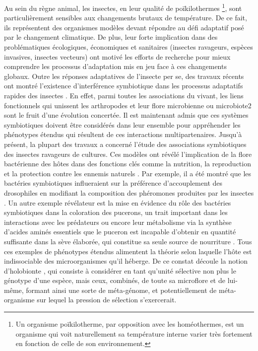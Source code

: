 Au sein du règne animal, les insectes, en leur qualité de poïkilothermes%
\footnote{Un organisme poïkilotherme, par opposition avec les homéothermes, est un organisme qui voit naturellement sa température interne varier très fortement en fonction de celle de son environnement.},
sont particulièrement sensibles aux changements brutaux de température.
De ce fait, ils représentent des organismes modèles devant répondre au défi adaptatif posé par le changement climatique.
De plus, leur forte implication dans des problématiques écologiques, économiques et sanitaires (insectes ravageurs, espèces invasives, insectes vecteurs) ont motivé les efforts de recherche pour mieux comprendre les processus d'adaptation mis en jeu face à ces changements globaux.
Outre les réponses adaptatives de l'insecte per se, des travaux récents ont montré l'existence d'interférence symbiotique dans les processus adaptatifs rapides des insectes \cite{feldhaar2011}.
En effet, parmi toutes les associations du vivant, les liens fonctionnels qui unissent les arthropodes et leur flore microbienne ou microbiote2 sont le fruit d'une évolution concertée.
Il est maintenant admis que ces systèmes symbiotiques doivent être considérés dans leur ensemble pour appréhender les phénotypes étendus qui résultent de ces interactions multipartenaires.
Jusqu'à présent, la plupart des travaux a concerné l'étude des  associations  symbiotiques  des  insectes  ravageurs  de  cultures.
Ces  modèles  ont  révélé  l'implication  de  la  flore  bactérienne  des  hôtes  dans  des  fonctions  clés  comme  la nutrition, la reproduction et la protection contre les ennemis naturels \cite{dillondillon}.
Par exemple, il a été montré que les bactéries symbiotiques influeraient sur la préférence d'accouplement des drosophiles en modifiant la composition des phéromones produites par les insectes \cite{sharon2010}.
Un autre exemple révélateur est la mise en évidence du rôle des bactéries symbiotiques dans la coloration des pucerons, un trait important dans les interactions avec les prédateurs \cite{tsuchida2010} ou encore leur métabolisme via la synthèse d'acides aminés essentiels que le puceron est incapable d'obtenir en quantité suffisante dans la sève élaborée, qui constitue sa seule source de nourriture \cite{douglas1998}.
Tous ces exemples de phénotypes étendus alimentent la théorie selon laquelle l'hôte est indissociable des microorganismes qu'il héberge.
De ce constat découle la notion d'holobionte \cite{rosenberg2007}, qui consiste à considérer en tant qu'unité sélective non plus le génotype d'une espèce, mais ceux, combinés, de toute sa microflore et de lui-même, formant ainsi une sorte de méta-génome, et potentiellement de méta-organisme sur lequel la pression de sélection s'exercerait.

